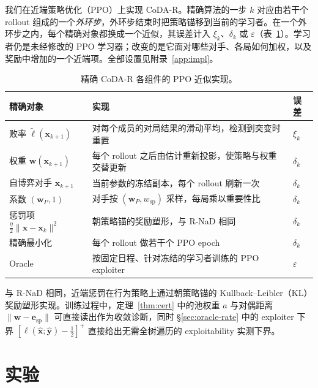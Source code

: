 \documentclass{article}
\theoremstyle{plain}
\theoremstyle{remark}
\newcommand{\bx}{{\bm{x}}}
\newcommand{\by}{{\bm{y}}}
\newcommand{\bw}{{\bm{w}}}
\newcommand{\be}{{\bm{e}}}
\newcommand{\bell}{{\bm{\ell}}}
\newcommand{\aug}{\tilde{\bell}}
\newcommand{\esp}{\be_{\mathrm{sp}}}
\newcommand{\wsp}{w_{\mathrm{sp}}}
\newcommand{\codar}{CoDA-R}
\begin{document}
我们在近端策略优化（PPO）\citep{schulman2017ppo}上实现 \codar{}。精确算法的一步 $k$ 对应由若干个 rollout 组成的一个\emph{外环步}，外环步结束时把策略锚移到当前的学习者。在一个外环步之内，每个精确对象都换成一个近似，其误差计入 $\xi_k$、$\delta_k$ 或 $\varepsilon$（表~\ref{tab:impl}）。学习者仍是未经修改的 PPO 学习器；改变的是它面对哪些对手、各局如何加权，以及奖励中增加的一个近端项。全部设置见附录~\ref{app:impl}。

\begin{table}[t]
\caption{精确 \codar{} 各组件的 PPO 近似实现。}
\label{tab:impl}
\begin{center}
\footnotesize
\setlength{\tabcolsep}{4pt}
\begin{tabular}{p{3.6cm}p{8.2cm}l}
\toprule
精确对象 & 实现 & 误差 \\
\midrule
败率 $\aug(\bx_{k+1})$ & 对每个成员的对局结果的滑动平均，检测到突变时重置 & $\xi_k$ \\
权重 $\bw(\bx_{k+1})$ & 每个 rollout 之后由估计重新投影，使策略与权重交替更新 & $\delta_k$ \\
自博弈对手 $\bx_{k+1}$ & 当前参数的冻结副本，每个 rollout 刷新一次 & $\delta_k$ \\
系数 $(\bw_P,1)$ & 对手按 $(\bw_P,\wsp)$ 采样，每局乘以重要性比 & $\delta_k$ \\
惩罚项 $\tfrac\eta2\|\bx-\bx_k\|^2$ & 朝策略锚的奖励塑形，与 R-NaD 相同 & $\delta_k$ \\
精确最小化 & 每个 rollout 做若干个 PPO epoch & $\delta_k$ \\
Oracle & 按固定日程、针对冻结的学习者训练的 PPO exploiter & $\varepsilon$ \\
\bottomrule
\end{tabular}
\end{center}
\end{table}

与 R-NaD 相同，近端惩罚在行为策略上通过朝策略锚的 Kullback--Leibler（KL）奖励塑形实现。训练过程中，定理~\ref{thm:cert} 中的池权重 $a$ 与对偶距离 $\|\bw-\esp\|$ 可直接读出作为收敛诊断，同时 \S\ref{sec:oracle-rate} 中的 exploiter 下界 $[\ell(\hat\bx;\hat\by)-\tfrac12]^+$ 直接给出无需全树遍历的 exploitability 实测下界。

\section{实验}
\label{sec:exp}
\end{document}

